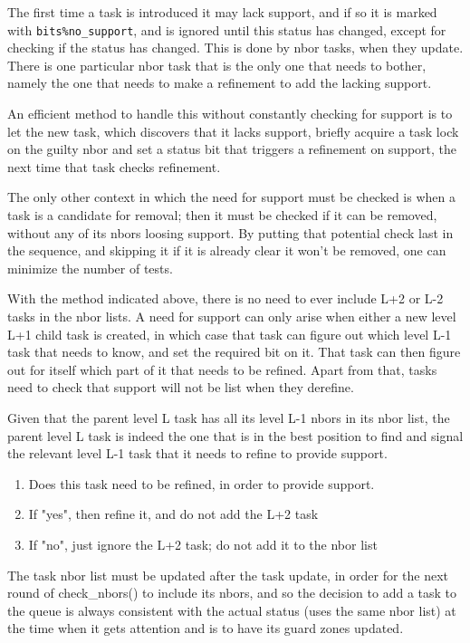 \documentclass[paper=a4,fontsize=11pt]{scrartcl}
\numberwithin{equation}{section}		%
\numberwithin{figure}{section}			%
\numberwithin{table}{section}				%
\newcommand{\codecolor}{\color{Blue}}
\newcommand{\Code}[1]{{\codecolor\texttt{#1}}}
\begin{document}
The first time a task is introduced it may lack support, and if so it is marked with \Code{bits\%no\_support}, and is ignored until this status has changed, except for checking if the status has changed.  This is done by nbor tasks, when they update.  There is one particular nbor task that is the only one that needs to bother, namely the one that needs to make a refinement to add the lacking support.

An efficient method to handle this without constantly checking for support is to let the new task, which discovers that it lacks support, briefly acquire a task lock on the guilty nbor and set a status bit that triggers a refinement on support, the next time that task checks refinement.

The only other context in which the need for support must be checked is when a task is a candidate for removal; then it must be checked if it can be removed, without any of its nbors loosing support.   By putting that potential check last in the sequence, and skipping it if it is already clear it won't be removed, one can minimize the number of tests.

With the method indicated above, there is no need to ever include L+2 or L-2 tasks in the nbor lists.  A need for support can only arise when either a new level L+1 child task is created, in which case that task can figure out which level L-1 task that needs to know, and set the required bit on it.  That task can then figure out for itself which part of it that needs to be refined.  Apart from that, tasks need to check that support will not be list when they derefine.

Given that the parent level L task has all its level L-1 nbors in its nbor list, the parent level L task is indeed the one that is in the best position to find and signal the relevant level L-1 task that it needs to refine to provide support.

\begin{enumerate}
    \item Does this task need to be refined, in order to provide support.
    \item If "yes", then refine it, and do not add the L+2 task
    \item If "no", just ignore the L+2 task; do not add it to the nbor list
\end{enumerate}

The task nbor list must be updated after the task update, in order for the next round of check\_nbors() to include its nbors, and so the decision to add a task to the queue is always consistent with the actual status (uses the same nbor list) at the time when it gets attention and is to have its guard zones updated.
\end{document}
